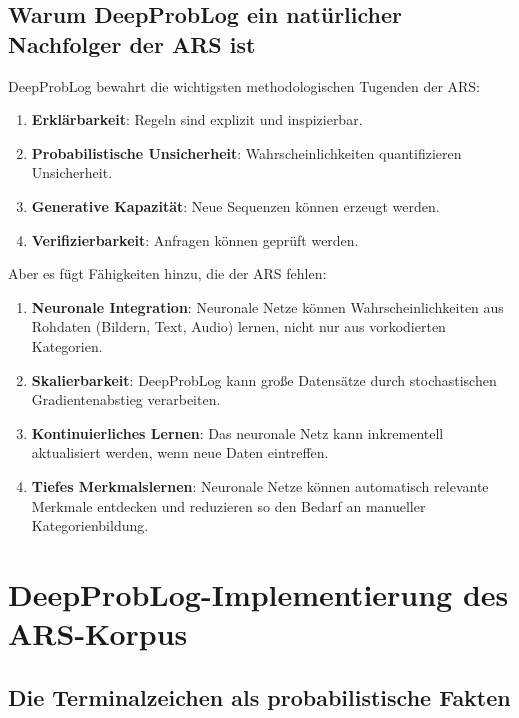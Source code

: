 \documentclass[12pt,a4paper]{article}
\begin{document}
\subsection{Warum DeepProbLog ein natürlicher Nachfolger der ARS ist}

DeepProbLog bewahrt die wichtigsten methodologischen Tugenden der ARS:

\begin{enumerate}
    \item \textbf{Erklärbarkeit}: Regeln sind explizit und inspizierbar.
    \item \textbf{Probabilistische Unsicherheit}: Wahrscheinlichkeiten 
    quantifizieren Unsicherheit.
    \item \textbf{Generative Kapazität}: Neue Sequenzen können erzeugt werden.
    \item \textbf{Verifizierbarkeit}: Anfragen können geprüft werden.
\end{enumerate}

Aber es fügt Fähigkeiten hinzu, die der ARS fehlen:

\begin{enumerate}
    \item \textbf{Neuronale Integration}: Neuronale Netze können Wahrscheinlichkeiten 
    aus Rohdaten (Bildern, Text, Audio) lernen, nicht nur aus vorkodierten 
    Kategorien.
    
    \item \textbf{Skalierbarkeit}: DeepProbLog kann große Datensätze durch 
    stochastischen Gradientenabstieg verarbeiten.
    
    \item \textbf{Kontinuierliches Lernen}: Das neuronale Netz kann inkrementell 
    aktualisiert werden, wenn neue Daten eintreffen.
    
    \item \textbf{Tiefes Merkmalslernen}: Neuronale Netze können automatisch 
    relevante Merkmale entdecken und reduzieren so den Bedarf an manueller 
    Kategorienbildung.
\end{enumerate}

\section{DeepProbLog-Implementierung des ARS-Korpus}

\subsection{Die Terminalzeichen als probabilistische Fakten}
\end{document}
